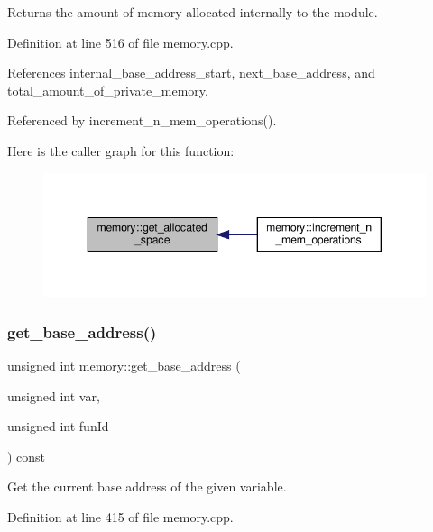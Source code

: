 Returns the amount of memory allocated internally to the module. 



Definition at line 516 of file memory.\+cpp.



References internal\+\_\+base\+\_\+address\+\_\+start, next\+\_\+base\+\_\+address, and total\+\_\+amount\+\_\+of\+\_\+private\+\_\+memory.



Referenced by increment\+\_\+n\+\_\+mem\+\_\+operations().

Here is the caller graph for this function\+:
\nopagebreak
\begin{figure}[H]
\begin{center}
\leavevmode
\includegraphics[width=343pt]{d8/d99/classmemory_aca163291c5d49ad384e5af2f5eb8d20a_icgraph}
\end{center}
\end{figure}
\mbox{\label{classmemory_a1ea5eb40b241fab9c4512b828223ea92}} 
\subsubsection{\texorpdfstring{get\+\_\+base\+\_\+address()}{get\_base\_address()}}
{\footnotesize\ttfamily unsigned int memory\+::get\+\_\+base\+\_\+address (\begin{DoxyParamCaption}\item[{unsigned int}]{var,  }\item[{unsigned int}]{fun\+Id }\end{DoxyParamCaption}) const}



Get the current base address of the given variable. 



Definition at line 415 of file memory.\+cpp.




